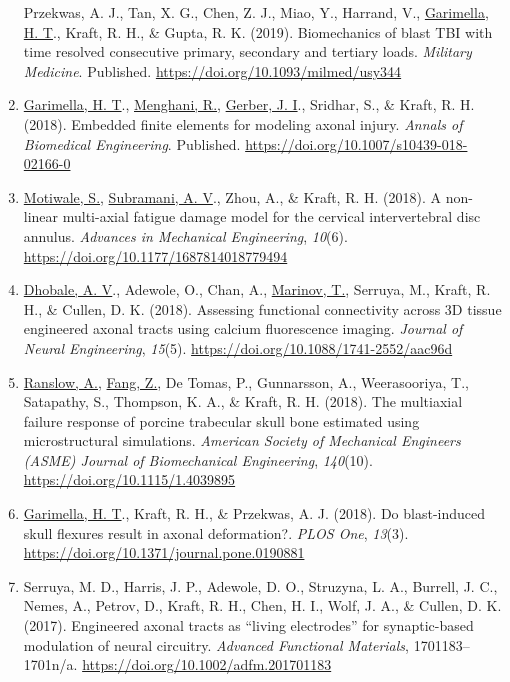 \documentclass[11pt]{article}
\begin{document}
\begin{enumerate}
  Przekwas, A. 
J., Tan, X. 
G., Chen, Z. 
J., Miao, Y., Harrand, V.,
  \underline{Garimella, H. 
T}., Kraft, R. 
H., \& Gupta, R. 
K. 
(2019). 
Biomechanics
  of blast TBI with time resolved consecutive primary, secondary and
  tertiary loads. 
\emph{Military Medicine}. 
Published.
  \url{https://doi.org/10.1093/milmed/usy344}
\item
  \underline{Garimella, H. 
T}., \underline{Menghani, R.}, \underline{Gerber, J. 
I}., Sridhar, S., \& Kraft,
  R. 
H. 
(2018). 
Embedded finite elements for modeling axonal injury.
  \emph{Annals of Biomedical Engineering}. 
Published.
  \url{https://doi.org/10.1007/s10439-018-02166-0}
\item
  \underline{Motiwale, S.}, \underline{Subramani, A. 
V}., Zhou, A., \& Kraft, R. 
H. 
(2018). 
A
  non-linear multi-axial fatigue damage model for the cervical
  intervertebral disc annulus. 
\emph{Advances in Mechanical
  Engineering}, \emph{10}(6).
  \url{https://doi.org/10.1177/1687814018779494}
\item
  \underline{Dhobale, A. 
V}., Adewole, O., Chan, A., \underline{Marinov, T.}, Serruya, M.,
  Kraft, R. 
H., \& Cullen, D. 
K. 
(2018). 
Assessing functional
  connectivity across 3D tissue engineered axonal tracts using calcium
  fluorescence imaging. 
\emph{Journal of Neural Engineering},
  \emph{15}(5). 
\url{https://doi.org/10.1088/1741-2552/aac96d}
\item
  \underline{Ranslow, A.}, \underline{Fang, Z.}, De Tomas, P., Gunnarsson, A., Weerasooriya, T.,
  Satapathy, S., Thompson, K. 
A., \& Kraft, R. 
H. 
(2018). 
The multiaxial
  failure response of porcine trabecular skull bone estimated using
  microstructural simulations. 
\emph{American Society of Mechanical
  Engineers (ASME) Journal of Biomechanical Engineering},
  \emph{140}(10). 
\url{https://doi.org/10.1115/1.4039895}
\item
  \underline{Garimella, H. 
T}., Kraft, R. 
H., \& Przekwas, A. 
J. 
(2018). 
Do
  blast-induced skull flexures result in axonal deformation?. 
\emph{PLOS
  One}, \emph{13}(3). 
\url{https://doi.org/10.1371/journal.pone.0190881}
\item
  Serruya, M. 
D., Harris, J. 
P., Adewole, D. 
O., Struzyna, L. 
A.,
  Burrell, J. 
C., Nemes, A., Petrov, D., Kraft, R. 
H., Chen, H. 
I.,
  Wolf, J. 
A., \& Cullen, D. 
K. 
(2017). 
Engineered axonal tracts as
  ``living electrodes'' for synaptic-based modulation of neural circuitry.
  \emph{Advanced Functional Materials}, 1701183--1701n/a.
  \url{https://doi.org/10.1002/adfm.201701183}

\end{enumerate}
\end{document}
